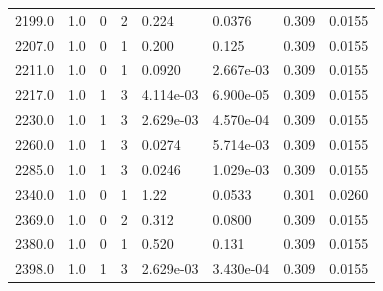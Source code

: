 \documentclass[preview]{standalone}
\begin{document}
{{{\begin{tabular}{L{1.2cm}C{1.2cm} C{0.3cm}C{0.5cm} C{1.4cm}C{1.4cm} C{1.4cm}C{1.4cm}}
  2199.0  &   1.0  & 0     &  2 &  0.224  & 0.0376  & 0.309 &  0.0155   \\ 
  2207.0  &   1.0  & 0     &  1 &  0.200  & 0.125  & 0.309 &  0.0155   \\ 
  2211.0  &   1.0  & 0     &  1 &  0.0920  & 2.667e-03  & 0.309 &  0.0155   \\ 
  2217.0  &   1.0  & 1     &  3 &  4.114e-03  & 6.900e-05  & 0.309 &  0.0155   \\ 
  2230.0  &   1.0  & 1     &  3 &  2.629e-03  & 4.570e-04  & 0.309 &  0.0155   \\ 
  2260.0  &   1.0  & 1     &  3 &  0.0274  & 5.714e-03  & 0.309 &  0.0155   \\ 
  2285.0  &   1.0  & 1     &  3 &  0.0246  & 1.029e-03  & 0.309 &  0.0155   \\ 
  2340.0  &   1.0  & 0     &  1 &  1.22  & 0.0533  & 0.301 &  0.0260   \\ 
  2369.0  &   1.0  & 0     &  2 &  0.312  & 0.0800  & 0.309 &  0.0155   \\ 
  2380.0  &   1.0  & 0     &  1 &  0.520  & 0.131  & 0.309 &  0.0155   \\ 
  2398.0  &   1.0  & 1     &  3 &  2.629e-03  & 3.430e-04  & 0.309 &  0.0155   \\ 
\hline 
\end{tabular} 

}}}
\end{document}
